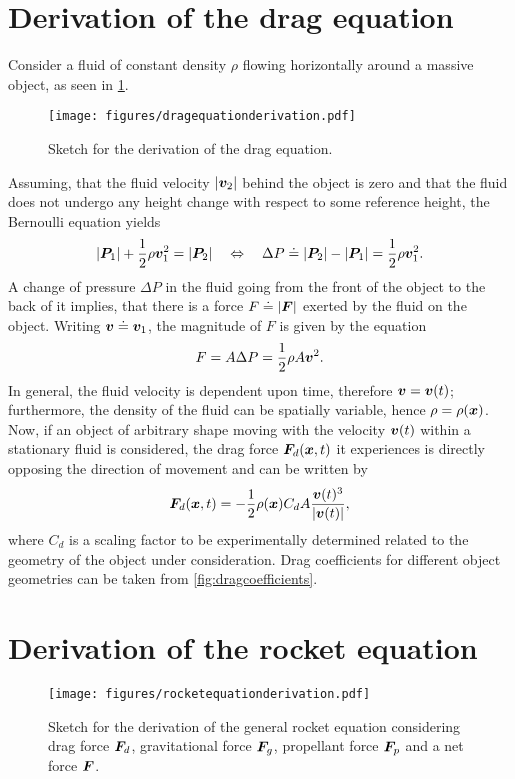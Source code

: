 \documentclass[a4paper,11pt]{report}
\begin{document}
\section{Derivation of the drag equation}
Consider a fluid of constant density $\rho$ flowing horizontally around a massive object, as seen in \cref{fig:dragequationderivation}.
\begin{figure}[h]
\centering
\texttt{[image: figures/dragequationderivation.pdf]}
\caption{Sketch for the derivation of the drag equation.}
\label{fig:dragequationderivation}
\end{figure}
Assuming, that the fluid velocity $|\bm{v}_2|$ behind the object is zero and that the fluid does not undergo any height change with respect to some reference height, the Bernoulli equation yields \begin{equation}
|\bm{P}_1| + \frac{1}{2}\rho \bm{v}_1^2 = |\bm{P}_2| \quad \Leftrightarrow \quad \Delta P \doteq |\bm{P}_2|-|\bm{P}_1| = \frac{1}{2}\rho \bm{v}_1^2.
\end{equation} A change of pressure $\Delta P$ in the fluid going from the front of the object to the back of it implies, that there is a force $F \doteq |\bm{F}|$ exerted by the fluid on the object. Writing $\bm{v} \doteq \bm{v}_1$, the magnitude of $F$ is given by the equation \begin{equation}
F = A \Delta P = \frac{1}{2}\rho A \bm{v}^2.
\end{equation} In general, the fluid velocity is dependent upon time, therefore $\bm{v} = \bm{v}(t)$; furthermore, the density of the fluid can be spatially variable, hence $\rho = \rho(\bm{x})$. Now, if an object of arbitrary shape moving with the velocity $\bm{v}(t)$ within a stationary fluid is considered, the drag force $\bm{F}_d(\bm{x},t)$ it experiences is directly opposing the direction of movement and can be written by \begin{equation}
\bm{F}_d(\bm{x},t) = - \frac{1}{2}\rho(\bm{x})C_d A \frac{\bm{v}(t)^3}{|\bm{v}(t)|},
\end{equation} where $C_d$ is a scaling factor to be experimentally determined related to the geometry of the object under consideration. Drag coefficients for different object geometries can be taken from \cref{fig:dragcoefficients}.

\section{Derivation of the rocket equation}
\begin{figure}[h]
\centering
\texttt{[image: figures/rocketequationderivation.pdf]}
\caption{Sketch for the derivation of the general rocket equation considering drag force $\bm{F}_d$, gravitational force $\bm{F}_g$, propellant force $\bm{F}_p$ and a net force $\bm{F}$.}
\label{fig:rocketequation}
\end{figure}
\end{document}
